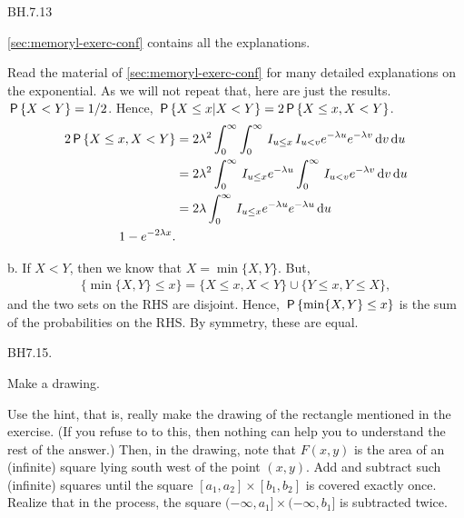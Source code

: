 \setcounter{theorem}{12}
\begin{exercise}
BH.7.13
\begin{hint}
\cref{sec:memoryl-exerc-conf} contains all the explanations.
\end{hint}
\begin{solution}
Read the material of \cref{sec:memoryl-exerc-conf} for many detailed explanations on the exponential. As we will not repeat that, here are just the results.
$\P{X<Y} = 1/2$. Hence, $\P{X\leq x|X<Y} = 2\P{X\leq x, X<Y}$.
\begin{align*}
2\P{X\leq x, X<Y}
  &= 2\lambda^2\int_0^{\infty}\int_0^{\infty}   \1{u\leq x} \1{u<v} e^{-\lambda u} e^{-\lambda v} \d v \d u \\
  &= 2\lambda^2\int_0^{\infty}   \1{u\leq x} e^{-\lambda u} \int_0^{\infty} \1{u<v}  e^{-\lambda v} \d v \d u\\
  &= 2\lambda\int_0^{\infty}   \1{u\leq x} e^{-\lambda u} e^{-\lambda u}  \d u \\
  1 - e^{-2\lambda x}.
\end{align*}

b. If $X<Y$, then we know that $X=\min\{X, Y\}$. But,
\begin{align*}
  \{\min\{X,Y\}\leq x\} =  \{X\leq x, X<Y\} \cup \{Y\leq x, Y\leq X\},
\end{align*}
and the two sets on the RHS are disjoint. Hence, $\P{\min\{X,Y\}\leq x}$ is the sum of the probabilities on the RHS. By symmetry, these are equal.
\end{solution}
\end{exercise}

\setcounter{theorem}{14}
\begin{exercise}
BH7.15.
\begin{hint}
Make a drawing.
\end{hint}
\begin{solution}
Use the hint, that is, really make the drawing of the rectangle mentioned in the exercise. (If you refuse to to this, then nothing can  help you to understand the rest of the answer.) Then, in the drawing, note that $F(x,y)$ is the area of an (infinite) square lying  south west of the point $(x,y)$. Add and subtract such (infinite) squares until the square $[a_1,a_2] \times [b_{1},b_2]$ is covered exactly once. Realize that in the process, the square $(-\infty, a_1] \times (-\infty, b_1]$ is subtracted twice.
\end{solution}
\end{exercise}


